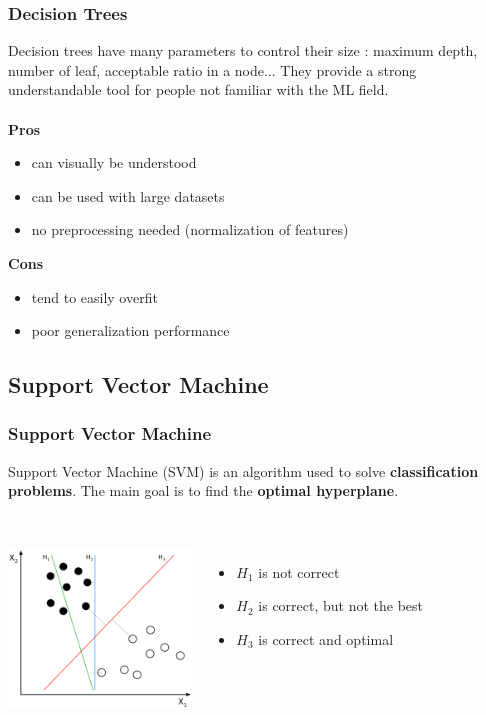 \documentclass{beamer}
\begin{document}
\begin{frame}
  \frametitle{Decision Trees}
  Decision trees have many parameters to control their size : maximum depth,
  number of leaf, acceptable ratio in a node... They provide a strong
  understandable tool for people not familiar with the ML field.
  \\~\\
  \textbf{Pros}
  \begin{itemize}
    \item can visually be understood
    \item can be used with large datasets
    \item no preprocessing needed (normalization of features)
  \end{itemize}

  \textbf{Cons}
  \begin{itemize}
    \item tend to easily overfit
    \item poor generalization performance
  \end{itemize}
\end{frame}

\subsection{Support Vector Machine}
\begin{frame}
  \frametitle{Support Vector Machine}
  Support Vector Machine (SVM) is an algorithm used to solve
  \textbf{classification problems}. The main goal is to find the \textbf{optimal
  hyperplane}.\\~\\

  \begin{columns}
      \centering
      \includegraphics[height=4.2cm]{img/svm-goal.png}

      \begin{itemize}
        \item ${H_1}$ is not correct
        \item ${H_2}$ is correct, but not the best
        \item ${H_3}$ is correct and optimal
      \end{itemize}
    \end{columns}
\end{frame}
\end{document}
